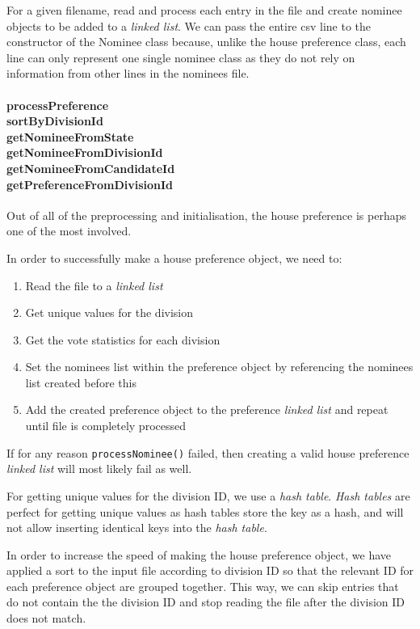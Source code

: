 \documentclass[a4paper, 12pt, titlepage]{article}
\newcommand{\code}[1]{\small\texttt{#1}\normalsize}
\begin{document}
For a given filename, read and process each entry in the file and create
nominee objects to be added to a \textit{linked list}. We can pass the
entire csv line to the constructor of the Nominee class because, unlike
the house preference class, each line can only represent one single nominee
class as they do not rely on information from other lines in the nominees
file.

\paragraph{processPreference \\
           sortByDivisionId \\
           getNomineeFromState \\
           getNomineeFromDivisionId \\
           getNomineeFromCandidateId \\
           getPreferenceFromDivisionId
} \hspace{0pt}

Out of all of the preprocessing and initialisation, the house preference
is perhaps one of the most involved.

In order to successfully make a house preference object, we need to:
\begin{enumerate}
    \item Read the file to a \textit{linked list}
    \item Get unique values for the division
    \item Get the vote statistics for each division
    \item Set the nominees list within the preference object by referencing
          the nominees list created before this
    \item Add the created preference object to the preference
          \textit{linked list} and repeat until file is completely processed
\end{enumerate}

If for any reason \code{processNominee()} failed, then creating a valid
house preference \textit{linked list} will most likely fail as well.

For getting unique values for the division ID, we use a \textit{hash table}.
\textit{Hash tables} are perfect for getting unique values as hash tables
store the key as a hash, and will not allow inserting identical keys into
the \textit{hash table}.

In order to increase the speed of making the house preference object, we
have applied a sort to the input file according to division ID so that the
relevant ID for each preference object are grouped together. This way, we can
skip entries that do not contain the the division ID and stop reading
the file after the division ID does not match.
\end{document}
